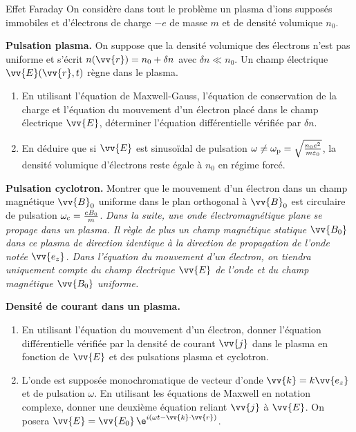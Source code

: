 \begin{exo}[PC]{Effet Faraday}
On considère dans tout le problème un plasma d'ions supposés immobiles et d'électrons de charge $-e$ de masse $m$ et de densité volumique $n_0$.
\begin{quest}
\item \textbf{Pulsation plasma.} On suppose que la densité volumique des électrons n'est pas uniforme et s'écrit $n(\vv{r})=n_0+\delta n$ avec $\delta n\ll n_0$. Un champ électrique $\vv{E}(\vv{r},t)$ règne dans le plasma.
\begin{enumerate}
\item En utilisant l'équation de Maxwell-Gauss, l'équation de conservation de la charge et l'équation du mouvement d'un électron placé dans le champ électrique $\vv{E}$, déterminer l'équation différentielle vérifiée par $\delta n$.
\item En déduire que si $\vv{E}$ est sinusoïdal de pulsation $\omega\neq\omega_{\rm{p}}=\sqrt{\frac{n_0e^2}{m\varepsilon_0}}$, la densité volumique d'électrons reste égale à $n_0$ en régime forcé.
\end{enumerate}
\item \textbf{Pulsation cyclotron.} Montrer que le mouvement d'un électron dans un champ magnétique $\vv{B}_0$ uniforme dans le plan orthogonal à $\vv{B}_0$ est circulaire de pulsation $\omega_{\rm{c}}=\frac{eB_0}{m}$.
\textit{Dans la suite, une onde électromagnétique plane se propage dans un plasma. Il règle de plus un champ magnétique statique $\vv{B_0}$ dans ce plasma de direction identique à la direction de propagation de l'onde notée $\vv{e_z}$. Dans l'équation du mouvement d'un électron, on tiendra uniquement compte du champ électrique $\vv{E}$ de l'onde et du champ magnétique $\vv{B_0}$ uniforme.}
\item \textbf{Densité de courant dans un plasma.}
\begin{enumerate}
\item En utilisant l'équation du mouvement d'un électron, donner l'équation différentielle vérifiée par la densité de courant $\vv{j}$ dans le plasma en fonction de $\vv{E}$ et des pulsations plasma et cyclotron.
\item L'onde est supposée monochromatique de vecteur d'onde $\vv{k}=k\vv{e_z}$ et de pulsation $\omega$. En utilisant les équations de Maxwell en notation complexe, donner une deuxième équation reliant $\vv{j}$ à $\vv{E}$. On posera $\vv{E}=\vv{E_0}\,\e^{i(\omega t-\vv{k}\cdot\vv{r})}$.

\end{enumerate}
\end{quest}
\end{exo}
